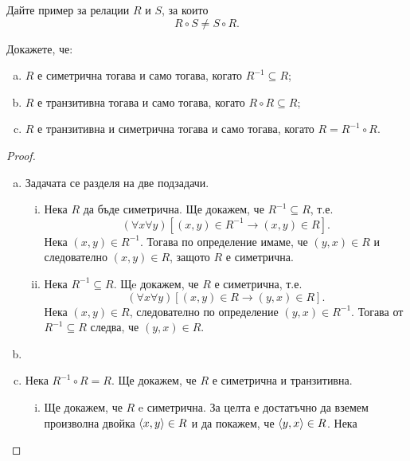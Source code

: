 \begin{problem}
  Дайте пример за релации $R$ и $S$, за които
  \[R\circ S \neq S\circ R.\]
\end{problem}

  
\begin{problem}
  Докажете, че:
  \begin{enumerate}[a)]
  \item
    $R$ е симетрична тогава и само тогава, когато $R^{-1}\subseteq R$;
  \item
    $R$ е транзитивна тогава и само тогава, когато $R\circ R\subseteq R$;
  \item
    $R$ е транзитивна и симетрична тогава и само тогава, когато $R = R^{-1}\circ R$.
\end{enumerate}
\end{problem}
\begin{proof}
  \begin{enumerate}[a)]
  \item
    Задачата се разделя на две подзадачи.
    \begin{enumerate}[(i)]
    \item
      Нека $R$ да бъде симетрична. Ще докажем, че $R^{-1}\subseteq R$, т.е.
      \[(\forall x\forall y)[(x,y)\in R^{-1} \rightarrow (x,y)\in R].\]
      Нека $(x,y)\in R^{-1}$. Тогава по определение имаме, че $(y,x)\in R$ и следователно $(x,y)\in R$,
      защото $R$ е симетрична.
    \item
      Нека $R^{-1}\subseteq R$. Щe докажем, че $R$ е симетрична, т.е.
      \[(\forall x\forall y)[(x,y)\in R \rightarrow (y,x)\in R].\]
      Нека $(x,y)\in R$, следователно по определение $(y,x)\in R^{-1}$.
      Тогава от $R^{-1}\subseteq R$ следва, че $(y,x)\in R$.
    \end{enumerate}
  \item
  \item
    Нека $R^{-1}\circ R = R$. Ще докажем, че $R$
    е симетрична и транзитивна.
    \begin{enumerate}[(i)]
    \item
      Ще докажем, че $R$ e симетрична.
      За целта е достатъчно да вземем произволна двойка $\langle{x,y}\rangle \in R$
      и да покажем, че $\langle{y,x}\rangle \in R$.
      Нека 

\end{enumerate}
\end{enumerate}
\end{proof}
